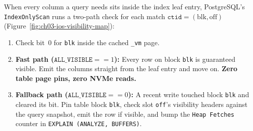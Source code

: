 When every column a query needs sits inside the index leaf entry, PostgreSQL's \texttt{IndexOnlyScan} runs a two-path check for each match $\texttt{ctid} = (\text{blk}, \text{off})$ (Figure~\ref{fig:ch03-ios-visibility-map}):
\begin{enumerate}
  \item Check bit~0 for \texttt{blk} inside the cached \texttt{\_vm} page.
  \item \textbf{Fast path ($\texttt{ALL\_VISIBLE} == 1$):} Every row on block \texttt{blk} is guaranteed visible. Emit the columns straight from the leaf entry and move on. \textbf{Zero table page pins, zero NVMe reads.}
  \item \textbf{Fallback path ($\texttt{ALL\_VISIBLE} == 0$):} A recent write touched block \texttt{blk} and cleared its bit. Pin table block \texttt{blk}, check slot \texttt{off}'s visibility headers against the query snapshot, emit the row if visible, and bump the \texttt{Heap Fetches} counter in \texttt{EXPLAIN (ANALYZE, BUFFERS)}.
\end{enumerate}

